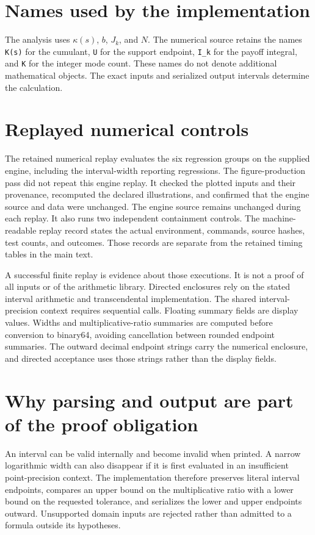 \section{Names used by the implementation}
The analysis uses $\kappa(s)$, $b$, $J_k$, and $N$. The numerical source retains the names \texttt{K(s)} for the cumulant, \texttt{U} for the support endpoint, \texttt{I\_k} for the payoff integral, and \texttt{K} for the integer mode count. These names do not denote additional mathematical objects. The exact inputs and serialized output intervals determine the calculation.

\section{Replayed numerical controls}\label{app:fresh-validation}
The retained numerical replay evaluates the six regression groups on the
supplied engine, including the interval-width reporting regressions. The
figure-production pass did not repeat this engine replay. It checked the
plotted inputs and their provenance, recomputed the declared illustrations,
and confirmed that the engine source and data were unchanged.
The engine source remains unchanged during each replay. It also runs two
independent containment controls. The machine-readable replay record states
the actual environment, commands, source hashes, test counts, and outcomes.
Those records are separate from the retained timing tables in the main text.



A successful finite replay is evidence about those executions. It is not a
proof of all inputs or of the arithmetic library. Directed enclosures rely on
the stated interval arithmetic and transcendental implementation. The shared
interval-precision context requires sequential calls. Floating summary fields
are display values. Widths and multiplicative-ratio summaries are computed
before conversion to binary64, avoiding cancellation between rounded endpoint
summaries. The outward decimal endpoint strings carry the numerical enclosure,
and directed acceptance uses those strings rather than the display fields.

\section{Why parsing and output are part of the proof obligation}
An interval can be valid internally and become invalid when printed. A narrow
logarithmic width can also disappear if it is first evaluated in an
insufficient point-precision context. The implementation therefore preserves
literal interval endpoints, compares an upper bound on the multiplicative
ratio with a lower bound on the requested tolerance, and serializes the lower
and upper endpoints outward. Unsupported domain inputs are rejected rather
than admitted to a formula outside its hypotheses.

